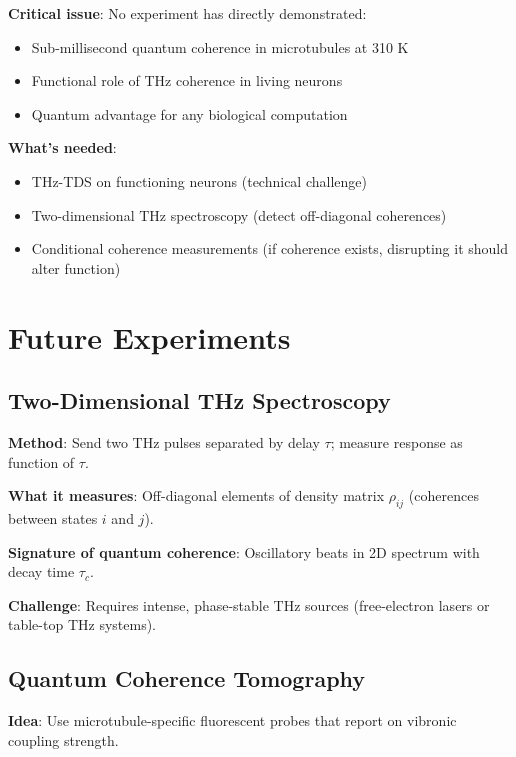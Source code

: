 \textbf{Critical issue}: No experiment has directly demonstrated:
\begin{itemize}
\item Sub-millisecond quantum coherence in microtubules at 310 K
\item Functional role of THz coherence in living neurons
\item Quantum advantage for any biological computation
\end{itemize}

\textbf{What's needed}:
\begin{itemize}
\item THz-TDS on functioning neurons (technical challenge)
\item Two-dimensional THz spectroscopy (detect off-diagonal coherences)
\item Conditional coherence measurements (if coherence exists, disrupting it should alter function)
\end{itemize}



\section{Future Experiments}\label{future-experiments}

\subsection{Two-Dimensional THz Spectroscopy}\label{two-dimensional-thz-spectroscopy}

\textbf{Method}: Send two THz pulses separated by delay $\tau$; measure response as function of $\tau$.

\textbf{What it measures}: Off-diagonal elements of density matrix $\rho_{ij}$ (coherences between states $i$ and $j$).

\textbf{Signature of quantum coherence}: Oscillatory beats in 2D spectrum with decay time $\tau_c$.

\textbf{Challenge}: Requires intense, phase-stable THz sources
(free-electron lasers or table-top THz systems).

\subsection{Quantum Coherence Tomography}\label{quantum-coherence-tomography}

\textbf{Idea}: Use microtubule-specific fluorescent probes that report
on vibronic coupling strength.

